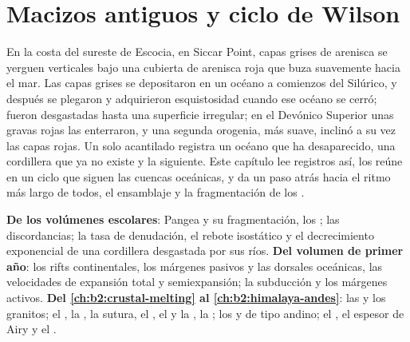 \chapter{Macizos antiguos y ciclo de Wilson}\label{ch:b2:wilson-cycle}

En la costa del sureste de Escocia, en Siccar Point, capas grises de arenisca se yerguen verticales
bajo una cubierta de arenisca roja que buza suavemente hacia el mar. Las capas grises se depositaron en
un océano a comienzos del Silúrico, y después se plegaron y adquirieron esquistosidad cuando ese océano se cerró; fueron desgastadas
hasta una superficie irregular; en el Devónico Superior unas gravas rojas las enterraron, y una segunda orogenia,
más suave, inclinó a su vez las capas rojas. Un solo acantilado registra un océano que ha
desaparecido, una cordillera que ya no existe y la siguiente. Este capítulo lee registros así,
los reúne en un ciclo que siguen las cuencas oceánicas, y da un paso atrás hacia el ritmo más largo de
todos, el ensamblaje y la fragmentación de los .

\begin{recall}
\textbf{De los volúmenes escolares}: Pangea y su fragmentación, los ; las discordancias;
la tasa de denudación, el rebote isostático y el decrecimiento exponencial de una cordillera desgastada
por sus ríos. \textbf{Del volumen de primer año}: los rifts continentales, los márgenes pasivos y
las dorsales oceánicas, las velocidades de expansión total y semiexpansión; la subducción y los márgenes activos.
\textbf{Del \cref{ch:b2:crustal-melting} al \cref{ch:b2:himalaya-andes}}: las  y los
granitos; el , la , la sutura, el , el  y la , la ; los 
y de tipo andino; el , el espesor de Airy y el .
\end{recall}

